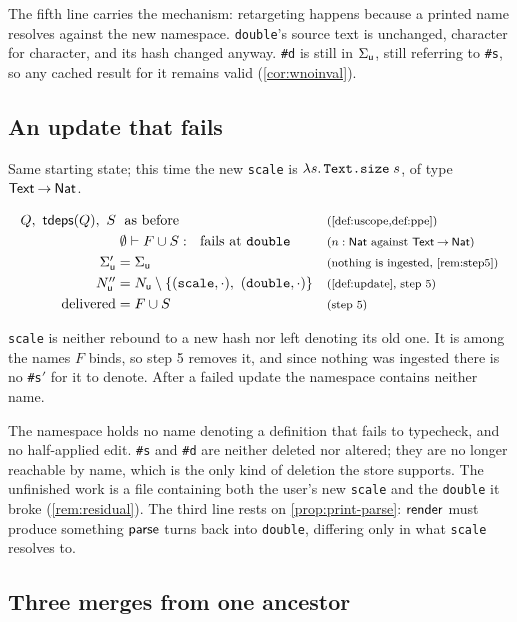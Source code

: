 \documentclass[11pt]{article}
\theoremstyle{definition}
\theoremstyle{plain}
\theoremstyle{remark}
\begin{document}
The fifth line carries the mechanism: retargeting happens because a printed name resolves against the
new namespace. \texttt{double}'s source text is unchanged, character for character, and its hash
changed anyway. \texttt{\#d} is still in $\Sigma_{\mathsf{u}}$, still referring to \texttt{\#s}, so any cached
result for it remains valid (\cref{cor:wnoinval}).

\subsection{An update that fails}\label{ex:update-fail}

Same starting state; this time the new \texttt{scale} is
$\lambda s.\,\texttt{Text.size}\;s$, of type $\mathsf{Text} \mathbin{\to} \mathsf{Nat}$.

\[
\begin{array}{r@{\;}l@{\quad}l}
  Q,\ \tdeps(Q),\ S &\text{ as before}
    & \just{\cref{def:uscope,def:ppe}} \\[3pt]
  {} &\utypes{\emptyset}{F \cup S}{\ } \text{ fails at \texttt{double}}
    & \just{$n : \TNat$ against $\uarr{\TText}{\TNat}$} \\[3pt]
  \UStore' &= \UStore
    & \just{nothing is ingested, \cref{rem:step5}} \\[3pt]
  \UNames'' &= \UNames \setminus \{(\texttt{scale}, \cdot),\ (\texttt{double}, \cdot)\}
    & \just{\cref{def:update}, step 5} \\[3pt]
  \text{delivered} &= F \cup S
    & \just{step 5}
\end{array}
\]

\texttt{scale} is neither rebound to a new hash nor left denoting its old one. It is among the names
$F$ binds, so step 5 removes it, and since nothing was ingested there is no \texttt{\#s}$'$ for it to
denote. After a failed update the namespace contains neither name.

The namespace holds no name denoting a definition that fails to typecheck, and no half-applied edit.
\texttt{\#s} and \texttt{\#d} are neither deleted nor altered; they are no longer reachable by name,
which is the only kind of deletion the store supports. The unfinished work is a file containing both
the user's new \texttt{scale} and the \texttt{double} it broke (\cref{rem:residual}). The third line
rests on \cref{prop:print-parse}: $\mathsf{render}$ must produce something $\mathsf{parse}$ turns back into
\texttt{double}, differing only in what \texttt{scale} resolves to.

\subsection{Three merges from one ancestor}\label{ex:merge-setup}
\end{document}
